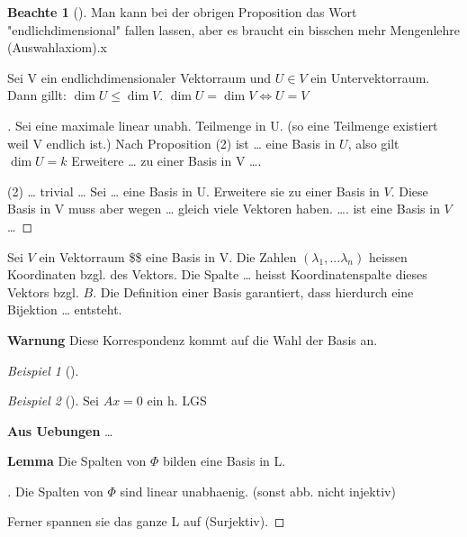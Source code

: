 \documentclass[11pt]{article}
\theoremstyle{remark}
\newtheorem{exa}{Beispiel}[section]
\theoremstyle{definition}
\newtheorem*{notte}{Beachte}
\theoremstyle{remark}
\begin{document}
\begin{notte}[] \label{}
Man kann bei der obrigen Proposition das Wort "endlichdimensional" fallen
lassen, aber es braucht ein bisschen mehr Mengenlehre (Auswahlaxiom).x
\end{notte}


\begin{theo}{}{}
Sei V ein endlichdimensionaler Vektorraum und \(U\in V\) ein Untervektorraum. Dann
gillt: \(\dim U \leq \dim V\).  \(\dim U = \dim V \iff U=V\)
\end{theo}

\begin{proof}[] \label{}
Sei eine maximale linear unabh. Teilmenge in U. (so eine Teilmenge existiert
weil V endlich ist.)
Nach Proposition (2) ist \ldots{} eine Basis in \(U\), also gilt \(\dim U = k\) Erweitere
\ldots{} zu einer Basis in V \ldots{}. 

(2) \ldots{} trivial \ldots{} Sei \ldots{} eine Basis in U. Erweitere sie zu einer Basis in
\(V\). Diese Basis in V muss aber wegen \ldots{} gleich viele Vektoren haben. \ldots{}. ist
eine Basis in \(V\) \ldots{}
\end{proof}


\begin{definition}{}{}
Sei \(V\) ein Vektorraum \$\$ eine Basis in V. Die Zahlen \((\lambda_1,...\lambda_n)\)
heissen Koordinaten bzgl. des Vektors. Die Spalte \ldots{} heisst Koordinatenspalte
dieses Vektors bzgl. \(B\).
Die Definition einer Basis garantiert, dass hierdurch eine Bijektion \ldots{} entsteht.
\end{definition}

\textbf{Warnung} Diese Korrespondenz kommt auf die Wahl der Basis an.

\begin{exa}[] \label{}

\end{exa}

\begin{exa}[] \label{}
Sei \(Ax=0\) ein h. LGS
\end{exa}

\textbf{Aus Uebungen} \ldots{}

\textbf{Lemma} Die Spalten von \(\Phi\) bilden eine Basis in L.
\begin{proof}[] \label{}
Die Spalten von \(\Phi\) sind linear unabhaenig. (sonst abb. nicht injektiv)

Ferner spannen sie das ganze L auf (Surjektiv). 
\end{proof}
\end{document}
